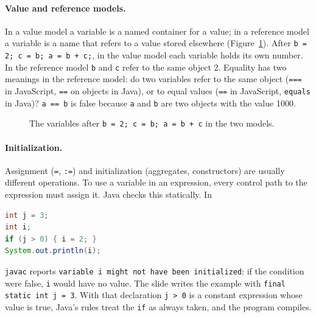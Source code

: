 \paragraph{Value and reference models.} In a value model a variable is a named
container for a value; in a reference model a variable is a name that refers
to a value stored elsewhere (Figure~\ref{fig:var-models}). After \texttt{b = 2;
c = b; a = b + c;}, in the value model each variable holds its own number. In
the reference model \texttt{b} and \texttt{c} refer to the same object 2. Equality
has two meanings in the reference model: do two variables refer to the same
object (\texttt{===} in JavaScript, \texttt{==} on objects in Java), or to
equal values (\texttt{==} in JavaScript, \texttt{equals} in Java)?
\texttt{a == b} is false because \texttt{a} and \texttt{b} are two objects
with the value 1000.

\begin{figure}[h]
\centering
{}
\caption{The variables after \texttt{b = 2; c = b; a = b + c} in the two models.}
\label{fig:var-models}
\end{figure}

\paragraph{Initialization.} Assignment (\texttt{=}, \texttt{:=}) and
initialization (aggregates, constructors) are usually different operations.
To use a variable in an expression, every control path to the expression
must assign it. Java checks this statically. In
\begin{lstlisting}[language=Java]
int j = 3;
int i;
if (j > 0) { i = 2; }
System.out.println(i);
\end{lstlisting}
\texttt{javac} reports \texttt{variable i might not have been initialized}: if
the condition were false, \texttt{i} would have no value. The slide writes the
example with \texttt{final static int j = 3}. With that declaration
\texttt{j > 0} is a constant expression whose value is true, Java's rules
treat the \texttt{if} as always taken, and the program compiles.


